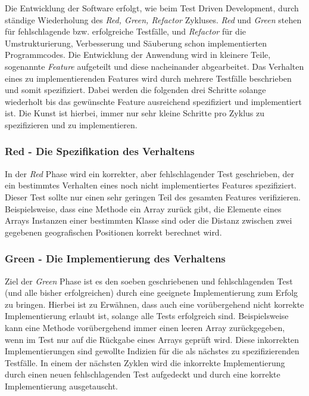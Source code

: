 Die Entwicklung der Software erfolgt, wie beim Test Driven
Development, durch ständige Wiederholung des \textit{Red, Green,
  Refactor} Zykluses. \textit{Red} und \textit{Green} stehen für
fehlschlagende bzw. erfolgreiche Testfälle, und \textit{Refactor} für
die Umstrukturierung, Verbesserung und Säuberung schon implementierten
Programmcodes. Die Entwicklung der Anwendung wird in kleinere Teile,
sogenannte \textit{Feature} aufgeteilt und diese nacheinander
abgearbeitet. Das Verhalten eines zu implementierenden Features wird
durch mehrere Testfälle beschrieben und somit spezifiziert. Dabei
werden die folgenden drei Schritte solange wiederholt bis das
gewünschte Feature ausreichend spezifiziert und implementiert ist. Die
Kunst ist hierbei, immer nur sehr kleine Schritte pro Zyklus zu
spezifizieren und zu implementieren.

\subsubsection{Red - Die Spezifikation des Verhaltens}
In der \textit{Red} Phase wird ein korrekter, aber fehlschlagender
Test geschrieben, der ein bestimmtes Verhalten eines noch nicht
implementiertes Features spezifiziert. Dieser Test sollte nur einen
sehr geringen Teil des gesamten Features verifizieren. Beispielsweise,
dass eine Methode ein Array zurück gibt, die Elemente eines Arrays
Instanzen einer bestimmten Klasse sind oder die Distanz zwischen zwei
gegebenen geografischen Positionen korrekt berechnet wird.

\subsubsection{Green - Die Implementierung des Verhaltens}
Ziel der \textit{Green} Phase ist es den soeben geschriebenen und
fehlschlagenden Test (und alle bisher erfolgreichen) durch eine
geeignete Implementierung zum Erfolg zu bringen. Hierbei ist zu
Erwähnen, dass auch eine vorübergehend nicht korrekte Implementierung
erlaubt ist, solange alle Tests erfolgreich sind. Beispielsweise kann
eine Methode vorübergehend immer einen leeren Array zurückgegeben,
wenn im Test nur auf die Rückgabe eines Arrays geprüft wird. Diese
inkorrekten Implementierungen sind gewollte Indizien für die als
nächstes zu spezifizierenden Testfälle. In einem der nächsten Zyklen
wird die inkorrekte Implementierung durch einen neuen fehlschlagenden
Test aufgedeckt und durch eine korrekte Implementierung ausgetauscht.

